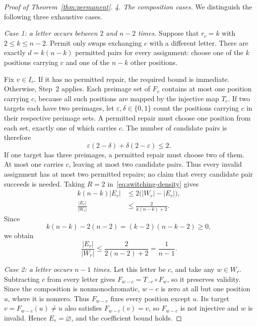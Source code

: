 \documentclass[10pt,a4paper]{amsart}
\begin{document}
\begin{proof}[Proof of Theorem~\ref{thm:permanent}]
\emph{4. The composition cases.}
We distinguish the following three exhaustive cases.

\emph{Case 1: a letter occurs between \(2\) and \(n-2\) times.}
Suppose that \(r_c=k\) with \(2\leq k\leq n-2\).
Permit only swaps exchanging \(c\) with a different letter.
There are exactly \(d=k(n-k)\) permitted pairs for every assignment:
choose one of the \(k\) positions carrying \(c\) and one of the
\(n-k\) other positions.

Fix \(v\in I_r\). If it has no permitted repair, the required
bound is immediate. Otherwise, Step~2 applies. Each preimage set of
\(F_v\) contains at most one position carrying \(c\), because all
such positions are mapped by the injective map \(T_c\).
If two targets each have two preimages, let
\(\varepsilon,\delta\in\{0,1\}\) count the positions carrying
\(c\) in their respective preimage sets. A permitted repair must
choose one position from each set, exactly one of which carries
\(c\). The number of candidate pairs is therefore
\begin{equation}
 \varepsilon(2-\delta)+\delta(2-\varepsilon)\leq2.
\end{equation}
If one target has three preimages, a permitted repair must choose
two of them. At most one carries \(c\), leaving at most two
candidate pairs. Thus every invalid assignment has at most two
permitted repairs; no claim that every candidate pair succeeds is
needed. Taking \(R=2\) in~\eqref{eq:switching-density} gives
\begin{equation}\label{eq:two}
 \begin{aligned}
 k(n-k)|E_r|&\leq2\bigl(|W_r|-|E_r|\bigr),\\
 \frac{|E_r|}{|W_r|}&\leq\frac2{k(n-k)+2}.
 \end{aligned}
\end{equation}
Since
\begin{equation}
 k(n-k)-2(n-2)=(k-2)(n-k-2)\geq0,
\end{equation}
we obtain
\begin{equation}
 \frac{|E_r|}{|W_r|}
 \leq\frac2{2(n-2)+2}=\frac1{n-1}.
\end{equation}

\emph{Case 2: a letter occurs \(n-1\) times.}
Let this letter be \(c\), and take any \(w\in W_r\).
Subtracting \(c\) from every letter gives
\(F_{w-c}=T_{-c}\circ F_w\), so it preserves validity.
Since the composition is nonmonochromatic, \(w-c\) is zero at
all but one position \(u\), where it is nonzero. Thus
\(F_{w-c}\) fixes every position except \(u\). Its target
\(v=F_{w-c}(u)\ne u\) also satisfies \(F_{w-c}(v)=v\),
so \(F_{w-c}\) is not injective and \(w\) is invalid.
Hence \(E_r=\varnothing\), and the coefficient bound holds.


\end{proof}
\end{document}
